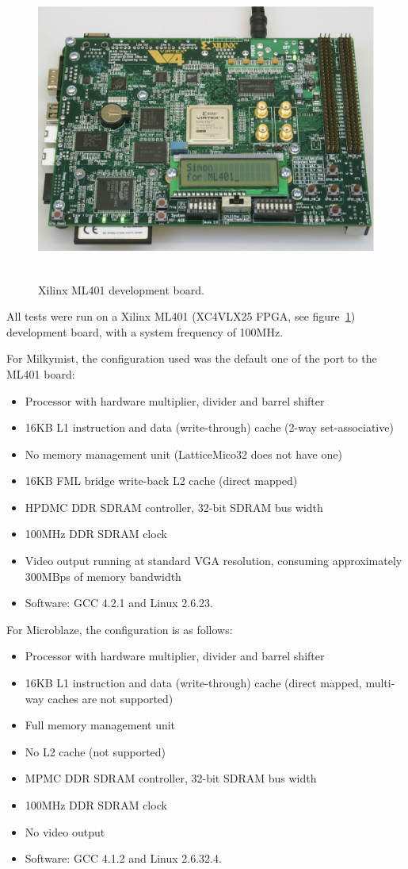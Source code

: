 \documentclass[a4paper,11pt]{kthesis}
\begin{document}
\begin{figure}[htp]
\centering
\includegraphics[height=100mm]{ml401.eps}
\caption{Xilinx ML401 development board.}
\label{fig:ml401}
\end{figure}

All tests were run on a Xilinx ML401 (XC4VLX25 FPGA, see figure~\ref{fig:ml401}) development board, with a system frequency of 100MHz.

For Milkymist, the configuration used was the default one of the port to the ML401 board:
\begin{itemize}
\item Processor with hardware multiplier, divider and barrel shifter
\item 16KB L1 instruction and data (write-through) cache (2-way set-associative)
\item No memory management unit (LatticeMico32 does not have one)
\item 16KB FML bridge write-back L2 cache (direct mapped)
\item HPDMC DDR SDRAM controller, 32-bit SDRAM bus width
\item 100MHz DDR SDRAM clock
\item Video output running at standard VGA resolution, consuming approximately 300MBps of memory bandwidth
\item Software: GCC 4.2.1 and Linux 2.6.23.
\end{itemize}

For Microblaze, the configuration is as follows:
\begin{itemize}
\item Processor with hardware multiplier, divider and barrel shifter
\item 16KB L1 instruction and data (write-through) cache (direct mapped, multi-way caches are not supported)
\item Full memory management unit
\item No L2 cache (not supported)
\item MPMC DDR SDRAM controller, 32-bit SDRAM bus width
\item 100MHz DDR SDRAM clock
\item No video output
\item Software: GCC 4.1.2 and Linux 2.6.32.4.
\end{itemize}
\end{document}
